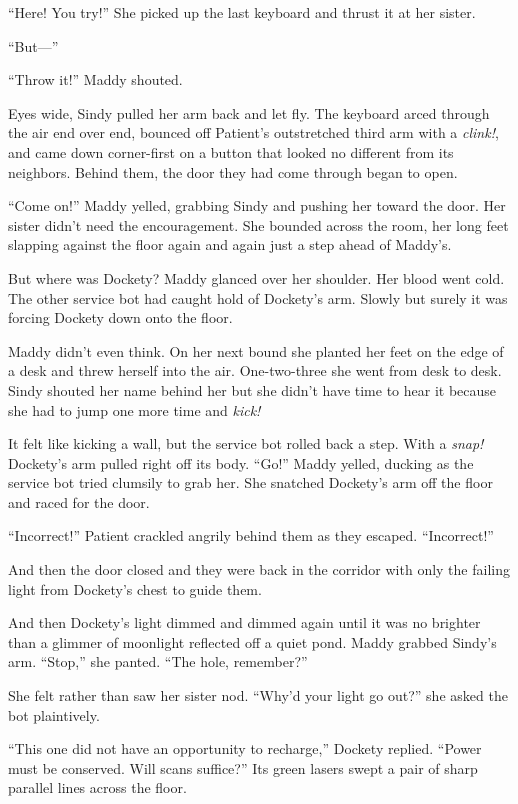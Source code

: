 \documentclass[10pt]{article}
\begin{document}
``Here! You try!'' She picked up the last keyboard and thrust it at her
sister.

``But---''

``Throw it!'' Maddy shouted.

Eyes wide, Sindy pulled her arm back and let fly. The keyboard arced
through the air end over end, bounced off Patient's outstretched third
arm with a \emph{clink!}, and came down corner-first on a button that
looked no different from its neighbors. Behind them, the door they had
come through began to open.

``Come on!'' Maddy yelled, grabbing Sindy and pushing her toward the
door. Her sister didn't need the encouragement. She bounded across the
room, her long feet slapping against the floor again and again just a
step ahead of Maddy's.

But where was Dockety? Maddy glanced over her shoulder. Her blood went
cold. The other service bot had caught hold of Dockety's arm. Slowly but
surely it was forcing Dockety down onto the floor.

Maddy didn't even think. On her next bound she planted her feet on the
edge of a desk and threw herself into the air. One-two-three she went
from desk to desk. Sindy shouted her name behind her but she didn't have
time to hear it because she had to jump one more time and \emph{kick!}

It felt like kicking a wall, but the service bot rolled back a step.
With a \emph{snap!} Dockety's arm pulled right off its body. ``Go!''
Maddy yelled, ducking as the service bot tried clumsily to grab her. She
snatched Dockety's arm off the floor and raced for the door.

``Incorrect!'' Patient crackled angrily behind them as they escaped.
``Incorrect!''

And then the door closed and they were back in the corridor with only
the failing light from Dockety's chest to guide them.

And then Dockety's light dimmed and dimmed again until it was no
brighter than a glimmer of moonlight reflected off a quiet pond. Maddy
grabbed Sindy's arm. ``Stop,'' she panted. ``The hole, remember?''

She felt rather than saw her sister nod. ``Why'd your light go out?''
she asked the bot plaintively.

``This one did not have an opportunity to recharge,'' Dockety replied.
``Power must be conserved. Will scans suffice?'' Its green lasers swept
a pair of sharp parallel lines across the floor.
\end{document}
